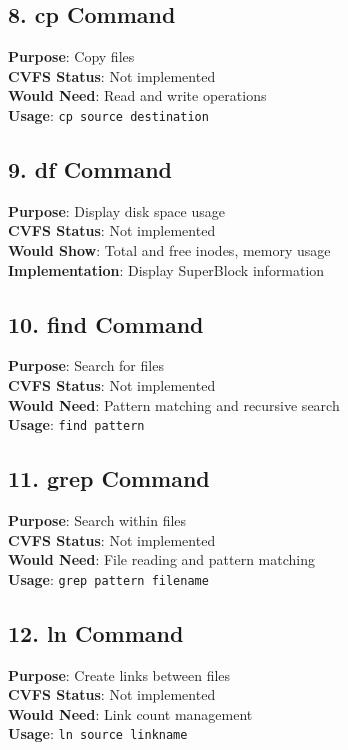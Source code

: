 \documentclass[11pt,a4paper]{article}
\begin{document}
\subsection{8. cp Command}
\textbf{Purpose}: Copy files\\
\textbf{CVFS Status}: Not implemented\\
\textbf{Would Need}: Read and write operations\\
\textbf{Usage}: \texttt{cp source destination}

\subsection{9. df Command}
\textbf{Purpose}: Display disk space usage\\
\textbf{CVFS Status}: Not implemented\\
\textbf{Would Show}: Total and free inodes, memory usage\\
\textbf{Implementation}: Display SuperBlock information

\subsection{10. find Command}
\textbf{Purpose}: Search for files\\
\textbf{CVFS Status}: Not implemented\\
\textbf{Would Need}: Pattern matching and recursive search\\
\textbf{Usage}: \texttt{find pattern}

\subsection{11. grep Command}
\textbf{Purpose}: Search within files\\
\textbf{CVFS Status}: Not implemented\\
\textbf{Would Need}: File reading and pattern matching\\
\textbf{Usage}: \texttt{grep pattern filename}

\subsection{12. ln Command}
\textbf{Purpose}: Create links between files\\
\textbf{CVFS Status}: Not implemented\\
\textbf{Would Need}: Link count management\\
\textbf{Usage}: \texttt{ln source linkname}
\end{document}
